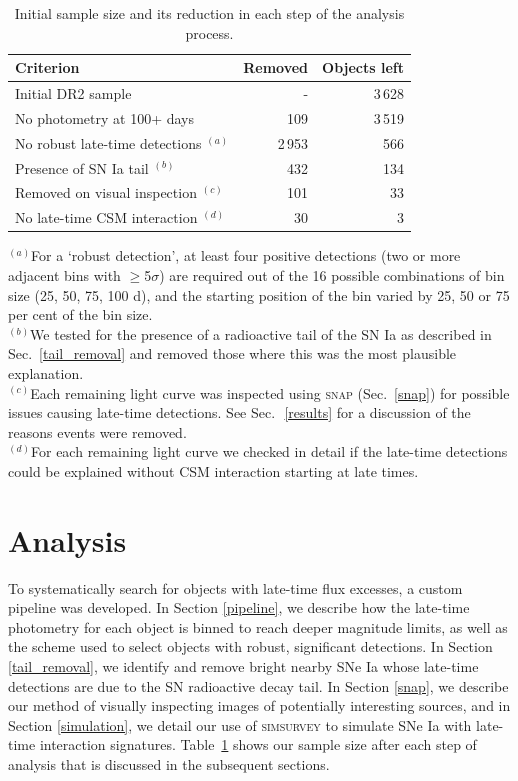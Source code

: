 \documentclass[a4paper,oneside,12pt, class=Latex/Classes/PhDthesisPSnPDF, crop=false]{standalone}
\begin{document}
\begin{table}
 \centering
 \caption{Initial sample size and its reduction in each step of the analysis process.}
 \begin{tabular}{lrr}
  \hline
  Criterion & Removed & Objects left\\
  \hline
  Initial DR2 sample & - & 3\,628\\
  No photometry at 100+ days & 109 & 3\,519\\
   No robust late-time detections $^{(a)}$ & 2\,953 & 566\\
  Presence of SN Ia tail $^{(b)}$ & 432 & 134\\
  Removed on visual inspection $^{(c)}$ & 101 & 33\\
  No late-time CSM interaction $^{(d)}$ & 30 & 3\\
  \hline
 \end{tabular}
 \label{obj_breakdown}
\begin{flushleft}
$^{(a)}$For a `robust detection', at least four positive detections (two or more adjacent bins with $\ge$5$\sigma$) are required out of the 16 possible combinations of bin size (25, 50, 75, 100 d), and the starting position of the bin varied by 25, 50 or 75 per cent of the bin size. \\
$^{(b)}$We tested for the presence of a radioactive tail of the SN Ia as described in Sec.~\ref{tail_removal} and removed those where this was the most plausible explanation. \\
$^{(c)}$Each remaining light curve was inspected using \textsc{snap} (Sec.~\ref{snap}) for possible issues causing late-time detections. See Sec.\,~\ref{results} for a discussion of the reasons events were removed.\\
$^{(d)}$For each remaining light curve we checked in detail if the late-time detections could be explained without CSM interaction starting at late times.
\end{flushleft}
\end{table}


\section{Analysis}\label{analysis}

To systematically search for objects with late-time flux excesses, a custom pipeline was developed. In Section \ref{pipeline}, we describe how the late-time photometry for each object is binned to reach deeper magnitude limits, as well as the scheme used to select objects with robust, significant detections. In Section \ref{tail_removal}, we identify and remove bright nearby SNe Ia whose late-time detections are due to the SN radioactive decay tail. In Section \ref{snap}, we describe our method of visually inspecting images of potentially interesting sources, and in Section \ref{simulation}, we detail our use of \textsc{simsurvey} to simulate SNe Ia with late-time interaction signatures. Table~\ref{obj_breakdown} shows our sample size after each step of analysis that is discussed in the subsequent sections. 
\end{document}
